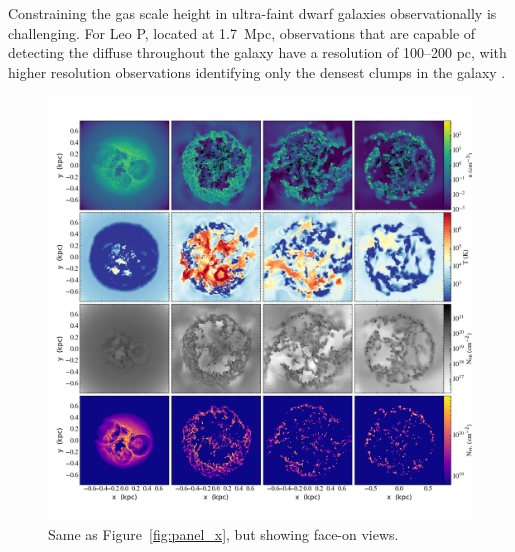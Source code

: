 \documentclass[twocolumn]{aastex61}
\begin{document}
Constraining the gas scale height in ultra-faint dwarf galaxies observationally is challenging. For Leo P, located at 1.7~Mpc,  observations that are capable of detecting the diffuse  throughout the galaxy have a resolution of 100--200 pc, with higher resolution observations identifying only the densest  clumps in the galaxy \citep[e.g.][]{Bernstein-Cooper2014}.

\begin{figure}
\centering
\includegraphics[width=0.975\linewidth]{multiplot_4x4_z.png}
\caption{Same as Figure~\ref{fig:panel_x}, but showing face-on views.}
\label{fig:panel_z}
\end{figure}
\end{document}
